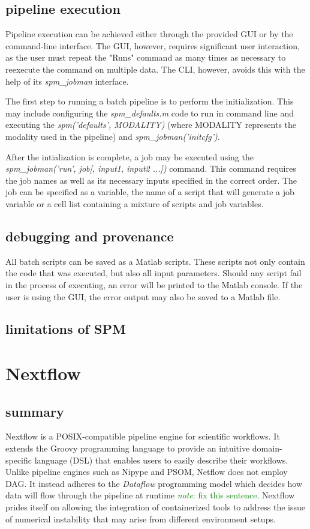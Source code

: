 \documentclass{report}
\newcommand{\note}[1]{\textcolor{green}{\textit{note}: #1}}
\begin{document}
        \subsection{pipeline execution}
        Pipeline execution can be achieved either through the provided GUI or by
the command-line interface. The GUI, however, requires significant user
interaction, as the user must repeat the "Runs" command as many times as
necessary to reexecute the command on multiple data. The CLI, however, avoids
this with the help of its \textit{spm\_jobman} interface.

        The first step to running a batch pipeline is to perform the
initialization. This may include configuring the \textit{spm\_defaults.m} code
to run in command line and executing the \textit{spm(’defaults’, MODALITY)}
(where MODALITY represents the modality used in the pipeline) and
\textit{spm\_jobman(’initcfg’)}.

        After the intialization is complete, a job may be executed using the
\textit{spm\_jobman(’run’, job[, input1, input2 ...])} command. This command
requires the job names as well as its necessary inputs specified in the correct
order. The job can be specified as a variable, the name of a script that will
generate a job variable or a cell list containing a mixture of scripts and job
variables. 
         
        \subsection{debugging and provenance}
        All batch scripts can be saved as a Matlab scripts. These scripts not
only contain the code that was executed, but also all input parameters. Should
any script fail in the process of executing, an error will be printed to the
Matlab console. If the user is using the GUI, the error output may also be saved
to a Matlab file.
    
        \subsection{limitations of SPM}
    \section{Nextflow}
        \subsection{summary}
        Nextflow is a POSIX-compatible pipeline engine for scientific workflows.
It extends the Groovy programming language to provide an  intuitive domain-specific language (DSL) 
that enables users to easily describe their workflows. Unlike pipeline engines such as Nipype and
PSOM, Netflow does not employ DAG. It instead adheres to the
\textit{Dataflow} programming model which decides how data will flow through the pipeline at
runtime \note{fix this sentence}. Nextflow prides itself on allowing the
integration of containerized tools to address the issue of numerical instability
that may arise from different environment setups.
  
\end{document}
